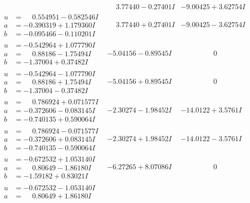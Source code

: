 \documentclass[1p]{elsarticle_modified}
\theoremstyle{definition}
\begin{document}
$$\begin{array}{c|c|c}
 & \phantom{-}3.77440 - 0.27401 I & -9.00425 + 3.62754 I \\ \hline\begin{aligned}
u &= \phantom{-}0.554951 - 0.582546 I \\
a &= -0.390319 + 1.179360 I \\
b &= -0.095466 - 0.110201 I\end{aligned}
 & \phantom{-}3.77440 + 0.27401 I & -9.00425 - 3.62754 I \\ \hline\begin{aligned}
u &= -0.542964 + 1.077790 I \\
a &= \phantom{-}0.88186 - 1.75494 I \\
b &= -1.37004 + 0.37482 I\end{aligned}
 & -5.04156 - 0.89545 I & \phantom{-0.000000 } 0 \\ \hline\begin{aligned}
u &= -0.542964 - 1.077790 I \\
a &= \phantom{-}0.88186 + 1.75494 I \\
b &= -1.37004 - 0.37482 I\end{aligned}
 & -5.04156 + 0.89545 I & \phantom{-0.000000 } 0 \\ \hline\begin{aligned}
u &= \phantom{-}0.786924 + 0.071577 I \\
a &= -0.372606 - 0.083145 I \\
b &= -0.740135 + 0.590064 I\end{aligned}
 & -2.30274 - 1.98452 I & -14.0122 + 3.5761 I \\ \hline\begin{aligned}
u &= \phantom{-}0.786924 - 0.071577 I \\
a &= -0.372606 + 0.083145 I \\
b &= -0.740135 - 0.590064 I\end{aligned}
 & -2.30274 + 1.98452 I & -14.0122 - 3.5761 I \\ \hline\begin{aligned}
u &= -0.672532 + 1.053140 I \\
a &= \phantom{-}0.80649 - 1.86180 I \\
b &= -1.59182 + 0.83021 I\end{aligned}
 & -6.27265 + 8.07086 I & \phantom{-0.000000 } 0 \\ \hline\begin{aligned}
u &= -0.672532 - 1.053140 I \\
a &= \phantom{-}0.80649 + 1.86180 I \\

\end{aligned}
\end{array}$$
\end{document}
